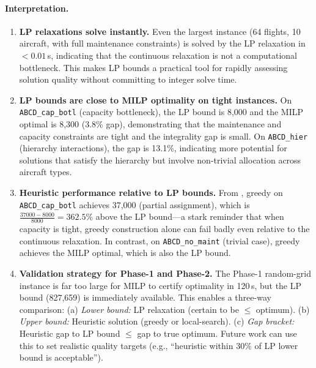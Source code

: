 \paragraph{Interpretation.}
\begin{enumerate}
  \item \textbf{LP relaxations solve instantly.}
    Even the largest instance (64 flights, 10 aircraft, with full maintenance
    constraints) is solved by the LP relaxation in $<0.01$\,s, indicating that
    the continuous relaxation is not a computational bottleneck. This makes LP
    bounds a practical tool for rapidly assessing solution quality without
    committing to integer solve time.

  \item \textbf{LP bounds are close to MILP optimality on tight instances.}
    On \texttt{ABCD\_cap\_botl} (capacity bottleneck), the LP bound is 8,000
    and the MILP optimal is 8,300 (3.8\% gap), demonstrating that the
    maintenance and capacity constraints are tight and the integrality gap is
    small. On \texttt{ABCD\_hier} (hierarchy interactions), the gap is 13.1\%,
    indicating more potential for solutions that satisfy the hierarchy but
    involve non-trivial allocation across aircraft types.

  \item \textbf{Heuristic performance relative to LP bounds.}
    From , greedy on \texttt{ABCD\_cap\_botl}
    achieves 37,000 (partial assignment), which is
    $\frac{37000 - 8000}{8000} = 362.5\%$ above the LP bound---a stark reminder
    that when capacity is tight, greedy construction alone can fail badly even
    relative to the continuous relaxation. In contrast, on
    \texttt{ABCD\_no\_maint} (trivial case), greedy achieves the MILP optimal,
    which is also the LP bound.

  \item \textbf{Validation strategy for Phase-1 and Phase-2.}
    The Phase-1 random-grid instance is far too large for MILP to certify
    optimality in 120\,s, but the LP bound (827,659) is immediately available.
    This enables a three-way comparison:
    (a) \emph{Lower bound:} LP relaxation (certain to be $\le$ optimum).
    (b) \emph{Upper bound:} Heuristic solution (greedy or local-search).
    (c) \emph{Gap bracket:} Heuristic gap to LP bound $\le$ gap to true optimum.
    Future work can use this to set realistic quality targets (e.g., ``heuristic
    within 30\% of LP lower bound is acceptable'').
\end{enumerate}
